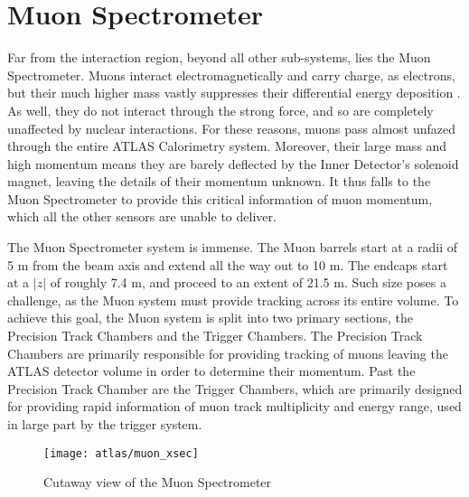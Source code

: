     


\section{Muon Spectrometer} \label{sec:muon}
    Far from the interaction region, beyond all other sub-systems, lies the Muon Spectrometer.
    Muons interact electromagnetically and carry charge, as electrons, but their much higher mass vastly suppresses their differential energy deposition \cite{wiley_radiation_detection}.
    As well, they do not interact through the strong force, and so are completely unaffected by nuclear interactions.
    For these reasons, muons pass almost unfazed through the entire ATLAS Calorimetry system.
    Moreover, their large mass and high momentum means they are barely deflected by the Inner Detector's solenoid magnet, leaving the details of their momentum unknown.
    It thus falls to the Muon Spectrometer to provide this critical information of muon momentum, which all the other sensors are unable to deliver.

    The Muon Spectrometer system is immense.
    The Muon barrels start at a radii of 5 m from the beam axis and extend all the way out to 10 m.
    The endcaps start at a $|z|$ of roughly 7.4 m, and proceed to an extent of 21.5 m.
    Such size poses a challenge, as the Muon system must provide tracking across its entire volume.
    To achieve this goal, the Muon system is split into two primary sections, the Precision Track Chambers and the Trigger Chambers.
    The Precision Track Chambers are primarily responsible for providing tracking of muons leaving the ATLAS detector volume in order to determine their momentum.
    Past the Precision Track Chamber are the Trigger Chambers, which are primarily designed for providing rapid information of muon track multiplicity and energy range, used in large part by the trigger system.

    \begin{figure}
        \texttt{[image: atlas/muon\_xsec]}
        \caption{Cutaway view of the Muon Spectrometer \cite{atlas_tdr}}
        \label{fig:muon_xsec}
    \end{figure}


